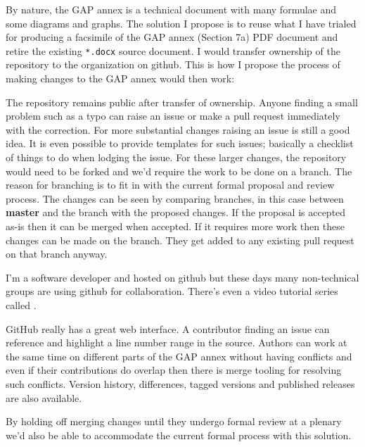 \documentclass{article}
\begin{document}
By nature, the GAP annex is a technical document with many formulae and some
diagrams and graphs. The solution I propose is to reuse what I have trialed for
producing a facsimile of the GAP annex (Section 7a) PDF document and retire the
existing \texttt{*.docx} source document. I would transfer ownership of the
 repository to the
 organization on github. This is
how I propose the process of making changes to the GAP annex would then work:

The repository remains public after transfer of ownership. Anyone finding
a small problem such as a typo can raise an issue or make a pull request
immediately with the correction. For more substantial changes raising an issue
is still a good idea. It is even possible to provide templates for such issues;
basically a checklist of things to do when lodging the issue. For these larger
changes, the repository would need to be forked and we'd require the work to be
done on a branch. The reason for branching is to fit in with the current formal
proposal and review process.  The changes can be seen by comparing branches, in
this case between \textbf{master} and the branch with the proposed changes. If
the proposal is accepted as-is then it can be merged when accepted. If it
requires more work then these changes can be made on the branch. They get added
to any existing pull request on that branch anyway.

I'm a software developer and  hosted on github but these days many non-technical groups are
using github for collaboration.  There's even a video tutorial series called
.

GitHub really has a great web interface. A contributor finding an issue can
reference and highlight a line number range in the source. Authors can work at
the same time on different parts of the GAP annex without having conflicts and
even if their contributions do overlap then there is merge tooling for
resolving such conflicts.  Version history, differences, tagged versions and
published releases are also available.

By holding off merging changes until they undergo formal review at a plenary
we'd also be able to accommodate the current formal process with this solution.
\end{document}
